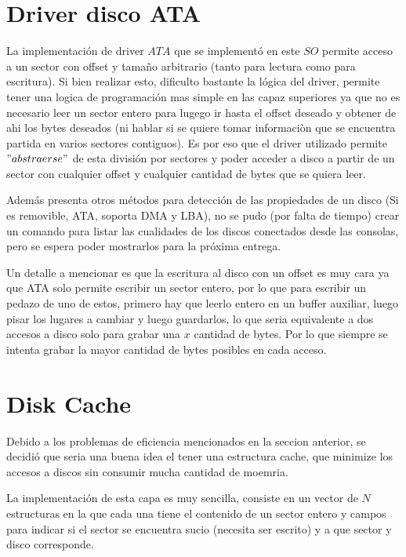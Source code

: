 \documentclass[english]{article}
\begin{document}
\section{Driver disco ATA}

La implementación de driver $ATA$ que se implementó en este $SO$
permite acceso a un sector con offset y tamaño arbitrario (tanto para
lectura como para escritura). Si bien realizar esto, dificulto bastante
la lógica del driver, permite tener una logica de programación mas
simple en las capaz superiores ya que no es necesario leer un sector
entero para lugego ir hasta el offset deseado y obtener de ahi los
bytes deseados (ni hablar si se quiere tomar informaciòn que se encuentra
partida en varios sectores contiguos). Es por eso que el driver utilizado
permite $"abstraerse"$ de esta división por sectores y poder acceder
a disco a partir de un sector con cualquier offset y cualquier cantidad
de bytes que se quiera leer.

Además presenta otros métodos para detección de las propiedades de
un disco (Si es removible, ATA, soporta DMA y LBA), no se pudo (por
falta de tiempo) crear un comando para listar las cualidades de los
discos conectados desde las consolas, pero se espera poder mostrarlos
para la próxima entrega.

Un detalle a mencionar es que la escritura al disco con un offset
es muy cara ya que ATA solo permite escribir un sector entero, por
lo que para escribir un pedazo de uno de estos, primero hay que leerlo
entero en un buffer auxiliar, luego pisar los lugares a cambiar y
luego guardarlos, lo que seria equivalente a dos accesos a disco solo
para grabar una $x$ cantidad de bytes. Por lo que siempre se intenta
grabar la mayor cantidad de bytes posibles en cada acceso.

\pagebreak{}


\section{Disk Cache}

Debido a los problemas de eficiencia mencionados en la seccion anterior,
se decidió que seria una buena idea el tener una estructura cache,
que minimize los accesos a discos sin consumir mucha cantidad de moemria. 

La implementación de esta capa es muy sencilla, consiste en un vector
de $N$ estructuras en la que cada una tiene el contenido de un sector
entero y campos para indicar si el sector se encuentra sucio (necesita
ser escrito) y a que sector y disco corresponde.
\end{document}
